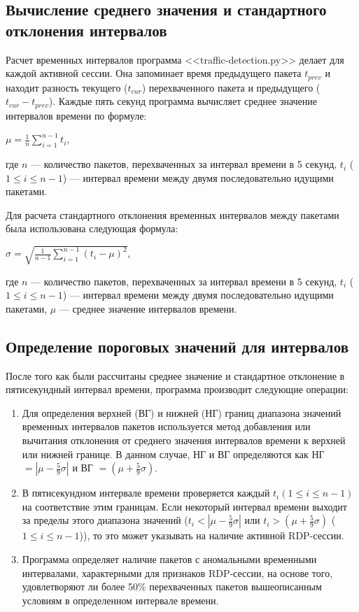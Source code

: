 \documentclass[bachelor, och, coursework]{SCWorks}
\begin{document}
\subsection{Вычисление среднего значения и стандартного отклонения интервалов}
Расчет временных интервалов программа <<traffic-detection.py>> делает для каждой активной сессии. Она запоминает время предыдущего пакета $t_{prev}$ и 
находит разность текущего ($t_{cur}$) перехваченного пакета и предыдущего ($t_{cur} - t_{prev}$). Каждые пять секунд программа вычисляет 
среднее значение интервалов времени по формуле:

\begin{center}
  $\mu = \frac{1}{n}\sum_{i = 1}^{n - 1} t_{i}$,
\end{center}

где $n$ --- количество пакетов, перехваченных за интервал времени в 5 секунд, $t_i$ ($1 \leq i \leq n - 1$) --- интервал времени между двумя 
последовательно идущими пакетами.

Для расчета стандартного отклонения временных интервалов между пакетами была использована следующая формула:

\begin{center}
  $\sigma = \sqrt{\frac{1}{n - 1} \sum_{i = 1}^{n - 1} (t_{i} - \mu)^2}$,
\end{center}

где $n$ --- количество пакетов, перехваченных за интервал времени в 5 секунд, $t_i$ ($1 \leq i \leq n - 1$) --- интервал времени между двумя 
последовательно идущими пакетами, 
$\mu$ --- среднее значение интервалов времени.

\subsection{Определение пороговых значений для интервалов}


После того как были рассчитаны среднее значение и стандартное отклонение в пятисекундный интервал времени, программа производит следующие операции:

\begin{enumerate}
  \item Для определения верхней (ВГ) и нижней (НГ) границ диапазона значений временных интервалов пакетов используется метод добавления или 
  вычитания отклонения от среднего значения интервалов времени к верхней или нижней границе. В данном случае, НГ и ВГ определяются как 
  НГ $= |\mu - \frac{5}{9}\sigma|$ и ВГ $= (\mu + \frac{5}{9}\sigma)$. 
  \item В пятисекундном интервале времени проверяется каждый $t_i (1 \leq i \leq n - 1)$ на соответствие этим границам. 
  Если некоторый интервал времени выходит за пределы этого диапазона значений ($t_i < |\mu - \frac{5}{9}\sigma|$ или $t_i > (\mu + \frac{5}{9}\sigma)$ 
  ($1 \leq i \leq n - 1$)), то это может указывать на наличие активной RDP-сессии.
  \item Программа определяет наличие пакетов с аномальными временными интервалами, характерными для признаков RDP-сессии, на основе того, 
  удовлетворяют ли более 50\% перехваченных пакетов вышеописанным условиям в определенном интервале времени.
\end{enumerate}
\end{document}

